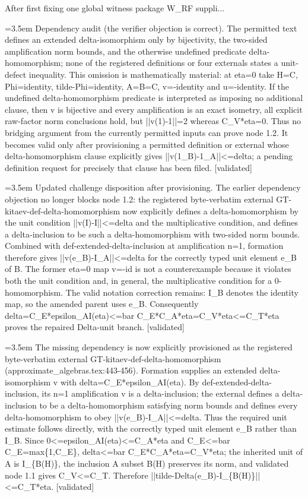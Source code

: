 \documentclass{article}
\newcommand{\step}[1]{\par\noindent\hangindent=3.5em\hangafter=1%
  \makebox[3.5em][l]{\textbf{#1.}}}
\newcommand{\steptag}[1]{\hfill{\small\textsf{[#1]}}}
\begin{document}
\begin{proofbox}{After first fixing one global witness package W\_RF suppli...}
\step{1.2.1} Dependency audit (the verifier objection is correct). The permitted text defines an extended delta-isomorphism only by bijectivity, the two-sided amplification norm bounds, and the otherwise undefined predicate delta-homomorphism; none of the registered definitions or four externals states a unit-defect inequality. This omission is mathematically material: at eta=0 take H=C, Phi=identity, tilde-Phi=identity, A=B=C, v=-identity and u=-identity. If the undefined delta-homomorphism predicate is interpreted as imposing no additional clause, then v is bijective and every amplification is an exact isometry, all explicit raw-factor norm conclusions hold, but ||v(1)-1||=2 whereas C\_V*eta=0. Thus no bridging argument from the currently permitted inputs can prove node 1.2. It becomes valid only after provisioning a permitted definition or external whose delta-homomorphism clause explicitly gives ||v(1\_B)-1\_A||<=delta; a pending definition request for precisely that clause has been filed. \steptag{validated} \\[4pt]
\step{1.2.2} Updated challenge disposition after provisioning. The earlier dependency objection no longer blocks node 1.2: the registered byte-verbatim external GT-kitaev-def-delta-homomorphism now explicitly defines a delta-homomorphism by the unit condition ||v(I)-I||<=delta and the multiplicative condition, and defines a delta-inclusion to be such a delta-homomorphism with two-sided norm bounds. Combined with def-extended-delta-inclusion at amplification n=1, formation therefore gives ||v(e\_B)-I\_A||<=delta for the correctly typed unit element e\_B of B. The former eta=0 map v=-id is not a counterexample because it violates both the unit condition and, in general, the multiplicative condition for a 0-homomorphism. The valid notation correction remains: I\_B denotes the identity map, so the amended parent uses e\_B. Consequently delta=C\_E*epsilon\_AI(eta)<=bar C\_E*C\_A*eta=C\_V*eta<=C\_T*eta proves the repaired Delta-unit branch. \steptag{validated} \\[4pt]
\step{1.2.3} The missing dependency is now explicitly provisioned as the registered byte-verbatim external GT-kitaev-def-delta-homomorphism (approximate\_algebras.tex:443-456). Formation supplies an extended delta-isomorphism v with delta=C\_E*epsilon\_AI(eta). By def-extended-delta-inclusion, its n=1 amplification v is a delta-inclusion; the external defines a delta-inclusion to be a delta-homomorphism satisfying norm bounds and defines every delta-homomorphism to obey ||v(e\_B)-I\_A||<=delta. Thus the required unit estimate follows directly, with the correctly typed unit element e\_B rather than I\_B. Since 0<=epsilon\_AI(eta)<=C\_A*eta and C\_E<=bar C\_E=max\{1,C\_E\}, delta<=bar C\_E*C\_A*eta=C\_V*eta; the inherited unit of A is I\_\{B(H)\}, the inclusion A subset B(H) preserves its norm, and validated node 1.1 gives C\_V<=C\_T. Therefore ||tilde-Delta(e\_B)-I\_\{B(H)\}||<=C\_T*eta. \steptag{validated} \\[4pt]

\end{proofbox}
\end{document}
